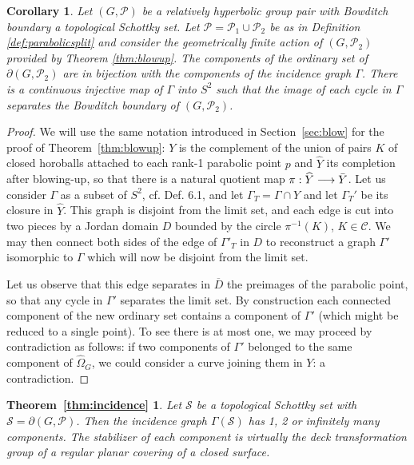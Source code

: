 \documentclass[11pt]{article}
\newtheorem{corollary}[theorem]{Corollary}
\newtheorem*{thmincidence}{Theorem~\ref{thm:incidence}}
\theoremstyle{definition}
\newcommand\CCC{\mathcal{C}}
\newcommand\PP{\mathcal{P}}
\renewcommand\hat{\widehat}
\begin{document}
\begin{corollary}\label{cor:comp}
Let $(G,\PP)$ be a relatively hyperbolic group pair with Bowditch boundary a topological Schottky
set. Let $\mathcal{P} = \PP_1 \cup \PP_2$ be as in Definition \ref{def:parabolicsplit} and consider the geometrically finite action of $(G,\PP_2)$ provided by
Theorem \ref{thm:blowup}.   The components of the ordinary set of $\partial(G,\PP_2)$ are in bijection with the components
of the incidence graph $\Gamma$. There is a continuous injective map of $\Gamma$ into $S^2$ such that the image of each cycle in $\Gamma$ separates the Bowditch boundary of $(G,\PP_2)$. \end{corollary}

\begin{proof} We will use the same notation introduced in Section~\ref{sec:blow} for the proof of Theorem~\ref{thm:blowup}: $Y$ is the complement of the union of pairs $K$ of closed horoballs attached to each rank-1 parabolic point $p$ and $\hat{Y}$ its completion after blowing-up, so that there is a natural quotient map $\pi:\hat{Y}\longrightarrow \Bar{Y}$.
Let us consider $\Gamma$ as a subset of $S^2$, cf. Def. 6.1, and let $\Gamma_T=\Gamma \cap Y$ and let $\Gamma_T'$ be its closure in $\hat{Y}$.
This graph is 
disjoint from the limit set, and each edge is cut into two pieces by  a Jordan domain  $D$ bounded by the circle $\pi^{-1}(K)$, $K\in\CCC$. We may then
connect both sides of the edge of $\Gamma'_T$ in $D$ to reconstruct a graph $\Gamma'$ isomorphic to $\Gamma$ which will now be disjoint from the limit set. 

Let us observe that this edge separates in $\overline{D}$ the preimages of the parabolic point, so that any cycle in $\Gamma'$ separates the limit set. 
By construction each connected component of the new ordinary set contains a component of $\Gamma'$ (which might be reduced to a single point). 
To see there is at most one,  we may proceed by contradiction as follows: if two components of $\Gamma'$ belonged to the same component of $\hat{\Omega}_G$,
we could consider a curve joining them in $Y$: a contradiction.
\end{proof}

\begin{thmincidence} Let $\mathcal{S}$ be a topological Schottky set with $\mathcal{S} = \partial(G, \mathcal{P})$.    Then the incidence graph $\Gamma(\mathcal{S})$ has 1, 2 or infinitely many components. The stabilizer of each component is virtually the deck transformation group of a regular planar covering of a closed surface.
\end{thmincidence} 
\end{document}
